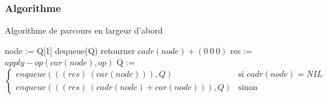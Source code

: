 \documentclass[a4paper, 12pt, leqno]{report}
\theoremstyle{plain}
\begin{document}
            \subsubsection{Algorithme}
            \begin{algorithm}
            \caption{Algorithme de parcours en largeur d'abord}
            \begin{algorithmic}
            \State node := Q[1]
            \State dequeue(Q)
                \State retourner $cadr(node) + (0\ 0\ 0)$
            \State res := $apply-op(car(node),op)$
                    \State Q := $\left\{\begin{array}{ll}
                    enqueue(((res)\ (car(node))),Q)&\text{si }cadr(node)=NIL\\
                    enqueue(((res)\ (cadr(node) +car(node))),Q)&\text{sinon}
                    \end{array}\right.$
            \EndIf
            \EndFor
            \EndIf   
            \EndWhile
            \end{algorithmic}
            \end{algorithm}  
\end{document}
